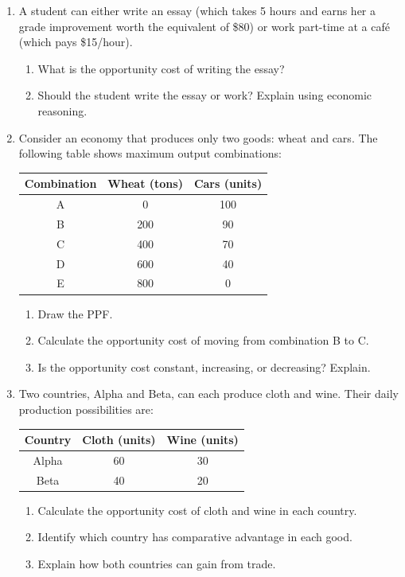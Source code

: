 \documentclass[12pt]{article}
\begin{document}
\begin{enumerate}[resume]
  \item 
  A student can either write an essay (which takes 5 hours and earns her a grade improvement worth the equivalent of \$80) or work part-time at a café (which pays \$15/hour).  
  \begin{enumerate}
      \item What is the opportunity cost of writing the essay?  
      \item Should the student write the essay or work? Explain using economic reasoning.
  \end{enumerate}

  \item 
  Consider an economy that produces only two goods: wheat and cars. The following table shows maximum output combinations:

  \begin{center}
  \begin{tabular}{c c c}
    \toprule
    Combination & Wheat (tons) & Cars (units) \\
    \midrule
    A & 0   & 100 \\
    B & 200 & 90  \\
    C & 400 & 70  \\
    D & 600 & 40  \\
    E & 800 & 0   \\
    \bottomrule
  \end{tabular}
  \end{center}
\newpage
  \begin{enumerate}
      \item Draw the PPF.  
      \item Calculate the opportunity cost of moving from combination B to C.  
      \item Is the opportunity cost constant, increasing, or decreasing? Explain.  
  \end{enumerate}

  \item
  Two countries, Alpha and Beta, can each produce cloth and wine. Their daily production possibilities are:

  \begin{center}
  \begin{tabular}{c c c}
    \toprule
    Country & Cloth (units) & Wine (units) \\
    \midrule
    Alpha & 60 & 30 \\
    Beta  & 40 & 20 \\
    \bottomrule
  \end{tabular}
  \end{center}

  \begin{enumerate}
      \item Calculate the opportunity cost of cloth and wine in each country.  
      \item Identify which country has comparative advantage in each good.  
      \item Explain how both countries can gain from trade.  
  \end{enumerate}



\end{enumerate}
\end{document}
